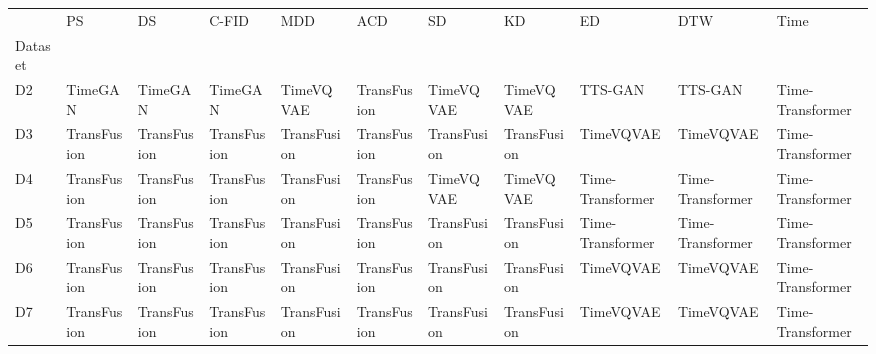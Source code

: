\begin{tabular}{lllllllllll}
{} & {PS} & {DS} & {C-FID} & {MDD} & {ACD} & {SD} & {KD} & {ED} & {DTW} & {Time} \\
{Dataset} & {} & {} & {} & {} & {} & {} & {} & {} & {} & {} \\
D2 & \cellcolor[HTML]{ADD8E6} TimeGAN & \cellcolor[HTML]{ADD8E6} TimeGAN & \cellcolor[HTML]{ADD8E6} TimeGAN & \cellcolor[HTML]{40E0D0} TimeVQVAE & \cellcolor[HTML]{90EE90} TransFusion & \cellcolor[HTML]{40E0D0} TimeVQVAE & \cellcolor[HTML]{40E0D0} TimeVQVAE & \cellcolor[HTML]{FFFF00} TTS-GAN & \cellcolor[HTML]{FFFF00} TTS-GAN & \cellcolor[HTML]{FFC0CB} Time-Transformer \\
D3 & \cellcolor[HTML]{90EE90} TransFusion & \cellcolor[HTML]{90EE90} TransFusion & \cellcolor[HTML]{90EE90} TransFusion & \cellcolor[HTML]{90EE90} TransFusion & \cellcolor[HTML]{90EE90} TransFusion & \cellcolor[HTML]{90EE90} TransFusion & \cellcolor[HTML]{90EE90} TransFusion & \cellcolor[HTML]{40E0D0} TimeVQVAE & \cellcolor[HTML]{40E0D0} TimeVQVAE & \cellcolor[HTML]{FFC0CB} Time-Transformer \\
D4 & \cellcolor[HTML]{90EE90} TransFusion & \cellcolor[HTML]{90EE90} TransFusion & \cellcolor[HTML]{90EE90} TransFusion & \cellcolor[HTML]{90EE90} TransFusion & \cellcolor[HTML]{90EE90} TransFusion & \cellcolor[HTML]{40E0D0} TimeVQVAE & \cellcolor[HTML]{40E0D0} TimeVQVAE & \cellcolor[HTML]{FFC0CB} Time-Transformer & \cellcolor[HTML]{FFC0CB} Time-Transformer & \cellcolor[HTML]{FFC0CB} Time-Transformer \\
D5 & \cellcolor[HTML]{90EE90} TransFusion & \cellcolor[HTML]{90EE90} TransFusion & \cellcolor[HTML]{90EE90} TransFusion & \cellcolor[HTML]{90EE90} TransFusion & \cellcolor[HTML]{90EE90} TransFusion & \cellcolor[HTML]{90EE90} TransFusion & \cellcolor[HTML]{90EE90} TransFusion & \cellcolor[HTML]{FFC0CB} Time-Transformer & \cellcolor[HTML]{FFC0CB} Time-Transformer & \cellcolor[HTML]{FFC0CB} Time-Transformer \\
D6 & \cellcolor[HTML]{90EE90} TransFusion & \cellcolor[HTML]{90EE90} TransFusion & \cellcolor[HTML]{90EE90} TransFusion & \cellcolor[HTML]{90EE90} TransFusion & \cellcolor[HTML]{90EE90} TransFusion & \cellcolor[HTML]{90EE90} TransFusion & \cellcolor[HTML]{90EE90} TransFusion & \cellcolor[HTML]{40E0D0} TimeVQVAE & \cellcolor[HTML]{40E0D0} TimeVQVAE & \cellcolor[HTML]{FFC0CB} Time-Transformer \\
D7 & \cellcolor[HTML]{90EE90} TransFusion & \cellcolor[HTML]{90EE90} TransFusion & \cellcolor[HTML]{90EE90} TransFusion & \cellcolor[HTML]{90EE90} TransFusion & \cellcolor[HTML]{90EE90} TransFusion & \cellcolor[HTML]{90EE90} TransFusion & \cellcolor[HTML]{90EE90} TransFusion & \cellcolor[HTML]{40E0D0} TimeVQVAE & \cellcolor[HTML]{40E0D0} TimeVQVAE & \cellcolor[HTML]{FFC0CB} Time-Transformer \\
\end{tabular}